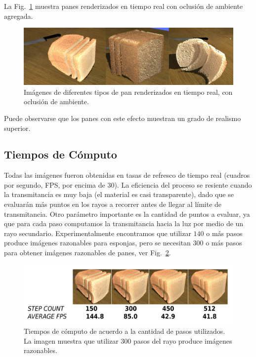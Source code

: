 La Fig.~\ref{fg:breads} muestra panes renderizados en tiempo real con oclusión de ambiente agregada.

\begin{figure}[htb!]
  \centerline{\includegraphics[width=13cm]{breads}}
  \caption{Imágenes de diferentes tipos de pan renderizados en tiempo real, con oclusión de ambiente.}
  \label{fg:breads}
\end{figure}

Puede observarse que los panes con este efecto muestran un grado de realismo superior.

\subsection*{Tiempos de Cómputo}

Todas las imágenes fueron obtenidas en tasas de refresco de tiempo real (cuadros por segundo, FPS, por encima de $30$).
La eficiencia del proceso se resiente cuando la transmitancia es muy baja (el material es casi transparente), dado que se evaluarán más puntos en los rayos a recorrer antes de llegar al límite de transmitancia.
Otro parámetro importante es la cantidad de puntos a evaluar, ya que para cada paso computamos la transmitancia hacia la luz por medio de un rayo secundario.
Experimentalmente encontramos que utilizar $140$ o más pasos produce imágenes razonables para esponjas, pero se necesitan $300$ o más pasos para obtener imágenes razonables de panes, ver Fig.~\ref{fg:stepcount}.


\begin{figure}
  \centerline{\includegraphics[width=13cm]{figures/stepcount}}
  \caption{Tiempos de cómputo de acuerdo a la cantidad de pasos utilizados. La imagen muestra que utilizar $300$ pasos del rayo produce imágenes razonables.}
  \label{fg:stepcount}
\end{figure}


